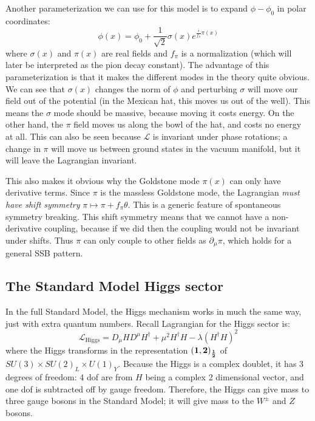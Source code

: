\documentclass[11pt, oneside]{article}   	%
\theoremstyle{definition}
\numberwithin{equation}{subsection}		%
\begin{document}
Another parameterization we can use for this model is to expand $\phi - \phi_0$ in polar coordinates:
\begin{equation}
	\phi(x) = \phi_0 + \frac{1}{\sqrt 2} \sigma(x) e^{\frac{i}{f_\pi} \pi(x)}
\end{equation}
where $\sigma(x)$ and $\pi(x)$ are real fields and $f_\pi$ is a normalization (which will later be interpreted as the pion decay 
constant). The advantage of this parameterization is that it makes the different modes in the theory quite obvious. We can see 
that $\sigma(x)$ changes the norm of $\phi$ and perturbing $\sigma$ will move our field out of the potential (in the Mexican 
hat, this moves us out of the well). This means the $\sigma$ mode should be massive, because moving it costs energy. 
On the other hand, the $\pi$ field moves us along the bowl of the hat, and costs no energy at all. This can also be seen because 
$\mathcal L$ is invariant under phase rotations; a change in $\pi$ will move us between ground states in the vacuum manifold, 
but it will leave the Lagrangian invariant. 

This also makes it obvious why the Goldstone mode $\pi(x)$ can only have derivative terms. Since $\pi$ is the massless Goldstone 
mode, the Lagrangian \textit{must have shift symmetry} $\pi\mapsto \pi + f_\pi\theta$. This is a generic feature of spontaneous 
symmetry breaking. This shift symmetry means that we cannot have a non-derivative coupling, because if we did then the coupling 
would not be invariant under shifts. Thus $\pi$ can only couple to other fields as $\partial_\mu\pi$, which holds for a general 
SSB pattern.

\subsection{The Standard Model Higgs sector}

In the full Standard Model, the Higgs mechanism works in much the same way, just with extra quantum numbers. Recall 
Lagrangian for the Higgs sector is:
\begin{equation}
	\mathcal{L}_\mathrm{Higgs} = D_\mu H D^\mu H^\dagger + \mu^2 H^\dagger H - \lambda (H^\dagger H)^2
\end{equation}
where the Higgs transforms in the representation $\bf (1, 2)_{\frac{1}{2}}$ of $SU(3)\times SU(2)_L\times U(1)_Y$. Because 
the Higgs is a complex doublet, it has 3 degrees of freedom: 4 dof are from $H$ being a complex 2 dimensional vector, and 
one dof is subtracted off by gauge freedom. Therefore, the Higgs can give mass to three gauge bosons in the Standard Model; 
it will give mass to the $W^\pm$ and $Z$ bosons. 
\end{document}
